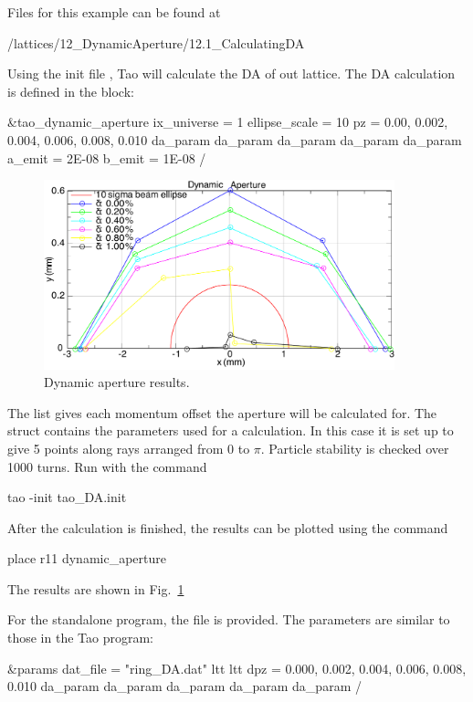 \documentclass{hitec}     %
\begin{document}
{{{{Files for this example can be found at 
\begin{code}
/lattices/12_DynamicAperture/12.1_CalculatingDA
\end{code}
Using the init file , Tao will calculate the DA of out lattice. The DA calculation is defined in the block:
\begin{code}
&tao_dynamic_aperture
 ix_universe = 1
 ellipse_scale = 10
 pz = 0.00, 0.002, 0.004, 0.006, 0.008, 0.010
 da_param%
 da_param%
 da_param%
 da_param%
 da_param%
 a_emit = 2E-08
 b_emit = 1E-08
/
\end{code}

\begin{figure}[tb]
  \centering
  \includegraphics[width=4in]{figures/da0.pdf}
  \caption{
Dynamic aperture results.
  }
  \label{f:da0}
\end{figure}

The  list gives each momentum offset the aperture will be calculated for. The  struct contains the parameters used for a calculation. In this case it is set up to give 5 points along rays arranged from 0 to $\pi$. Particle stability is checked over 1000 turns. Run \tao with the command
\begin{code}
tao -init tao_DA.init
\end{code}
After the calculation is finished, the results can be plotted using the command 
\begin{code}
place r11 dynamic_aperture
\end{code}
The results are shown in Fig.~\ref{f:da0}

For the standalone program, the file  is provided. The parameters are similar to those in the Tao program:
\begin{code}
&params
 dat_file = "ring_DA.dat"
 ltt%
 ltt%
 dpz = 0.000, 0.002, 0.004, 0.006, 0.008, 0.010
 da_param%
 da_param%
 da_param%
 da_param%
 da_param%
/
\end{code}

}}}}
\end{document}
